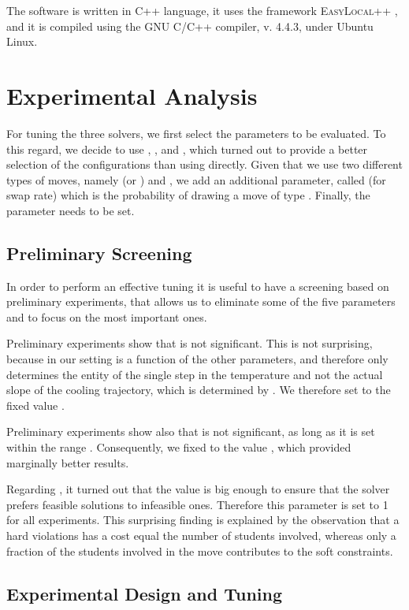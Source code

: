 \documentclass[authoryear,preprint,a4paper,12pt]{elsarticle}
\begin{document}
The software is written in C++ language, it uses the framework
\textsc{EasyLocal++} \citep{DiSc03b}, and it is compiled using the GNU
C/C++ compiler, v. 4.4.3, under Ubuntu Linux. 

\section{Experimental Analysis}
\label{sec:exper-analys}


For tuning the three solvers, we first select the parameters to be
evaluated.  To this regard, we decide to use , , and , which turned out to provide a better selection of the
configurations than using  directly. Given that we use two
different types of moves, namely  (or )
and , we add an additional parameter, called  (for
swap rate) which is the probability of drawing a move of type
. Finally, the parameter  needs to be set.

\subsection{Preliminary Screening}

In order to perform an effective tuning it is useful to have a screening
based on preliminary experiments, that allows us to eliminate some of
the five parameters and to focus on the most important ones.

Preliminary experiments show that  is not significant. This is
not surprising, because in our setting  is a function of the other
parameters, and therefore  only determines the entity of the
single step in the temperature and not the actual slope of the cooling
trajectory, which is determined by . We therefore set 
to the fixed value .

Preliminary experiments show also that  is not significant, as
long as it is set within the range . Consequently, we fixed
 to the value , which provided marginally better results.

Regarding , it turned out that the value  is big enough 
to ensure that the solver prefers feasible solutions to infeasible ones.
Therefore this parameter is set to 1 for all experiments.
This surprising finding is explained by the observation that a hard violations 
has a cost equal the number of students involved, whereas only a fraction of the 
students involved in the move contributes to the soft constraints.

\subsection{Experimental Design and Tuning}
\end{document}

